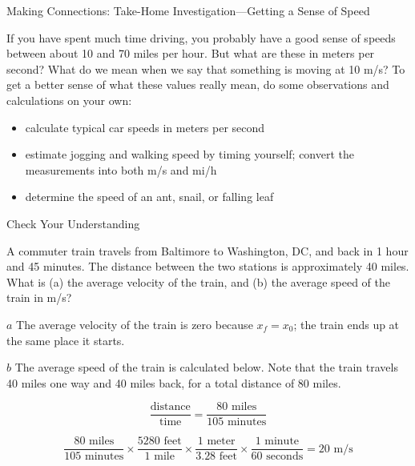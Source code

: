 \documentclass[
]{book}
\providecommand{\tightlist}{%
  \setlength{\itemsep}{0pt}\setlength{\parskip}{0pt}}
\newenvironment{note}{}{}
\begin{document}
\hypertarget{fs-id4030893}{}
\begin{note}

Making Connections: Take-Home Investigation---Getting a Sense of Speed

If you have spent much time driving, you probably have a good sense of
speeds between about 10 and 70 miles per hour. But what are these in
meters per second? What do we mean when we say that something is moving
at 10 m/s? To get a better sense of what these values really mean, do
some observations and calculations on your own:

\begin{itemize}
\tightlist
\item
  \protect\hypertarget{import-auto-id4058974}{}{calculate typical car speeds in meters per
  second}
\item
  \protect\hypertarget{import-auto-id4058977}{}{estimate jogging and walking speed by timing yourself; convert the
  measurements into both m/s and mi/h}
\item
  \protect\hypertarget{import-auto-id4070923}{}{determine the speed of an ant, snail, or falling
  leaf}
\end{itemize}

\end{note}

\hypertarget{fs-id4173641}{}
Check Your Understanding

\leavevmode\hypertarget{fs-id1744684}{}%
A commuter train travels from Baltimore to Washington, DC, and back in 1
hour and 45 minutes. The distance between the two stations is
approximately 40 miles. What is (a) the average velocity of the train,
and (b) the average speed of the train in m/s?

\leavevmode\hypertarget{fs-id1384034}{}%
\(a\) The average velocity of the train is zero because
\({x_{f} = x_{0}}{}\); the train ends up at the same place it starts.

\(b\) The average speed of the train is calculated below. Note that the
train travels 40 miles one way and 40 miles back, for a total distance
of 80 miles.

\leavevmode\hypertarget{import-auto-id4070756}{}%
\[{\frac{\text{distance}}{\text{time}} = \frac{\text{80\ miles}}{\text{105\ minutes}}}{}\]

\leavevmode\hypertarget{import-auto-id1750086}{}%
\[{{{\frac{\text{80\ miles}}{\text{105\ minutes}} \times \frac{\text{5280\ feet}}{\text{1\ mile}}} \times \frac{\text{1\ meter}}{3\text{.}\text{28\ feet}}} \times \frac{\text{1\ minute}}{\text{60\ seconds}}} = \text{20\ m/s}\]
\end{document}

